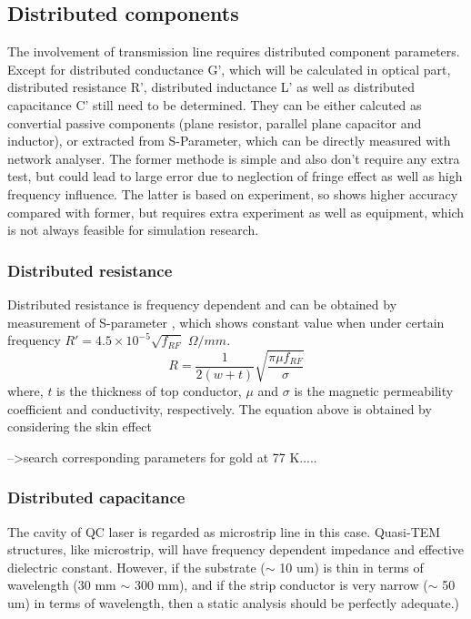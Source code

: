 \documentclass[11pt,final]{scrbook}
\begin{document}
\subsection{Distributed components}
The involvement of transmission line requires distributed component parameters. Except for distributed conductance G', which will be calculated in optical part, distributed resistance R', distributed inductance L' as well as distributed capacitance C' still need to be determined. They can be either calcuted as convertial passive components (plane resistor, parallel plane capacitor and inductor), or extracted from S-Parameter, which can be directly measured with network analyser. The former methode is simple and also don't require any extra test, but could lead to large error due to neglection of fringe effect\cite{pillai1970fringing} as well as high frequency influence. The latter is based on experiment, so shows higher accuracy compared with former, but requires extra experiment as well as equipment, which is not always feasible for simulation research. 

\subsubsection{Distributed resistance}
Distributed resistance is frequency dependent and can be obtained by measurement of S-parameter \cite{maineult2010microwave}, which shows constant value when under certain frequency $ R'=4.5\times10^{-5}\sqrt{f_{RF}}$  $\Omega/mm$.
\begin{equation}
R=\frac{1}{2(w+t)}\sqrt{\frac{\pi \mu f_{RF} }{\sigma}}
\end{equation}
where, $t$ is the thickness of top conductor, $\mu$ and $\sigma$ is the magnetic permeability coefficient and conductivity, respectively. The equation above is obtained by considering the skin effect

-->search corresponding parameters for gold at 77 K.....

\subsubsection{Distributed capacitance}
The cavity of QC laser is regarded as microstrip line in this case. Quasi-TEM structures, like microstrip, will have frequency dependent impedance and effective dielectric constant. However, if the substrate ($\sim$ 10 um) is thin in terms of wavelength (30 mm $\sim$ 300 mm), and if the strip conductor is very narrow ($\sim$ 50 um) in terms of wavelength, then a static analysis should be perfectly adequate.)
\end{document}
